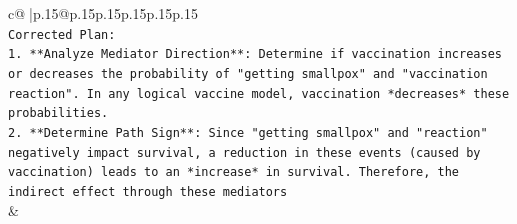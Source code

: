\documentclass{article}
\begin{document}
{\begin{supertabular}{c@{$\;$}|p{.15\linewidth}@{}p{.15\linewidth}p{.15\linewidth}p{.15\linewidth}p{.15\linewidth}p{.15\linewidth}}
{{{\\ 
\texttt{Corrected Plan:} \\
\texttt{1.  **Analyze Mediator Direction**: Determine if vaccination increases or decreases the probability of "getting smallpox" and "vaccination reaction". In any logical vaccine model, vaccination *decreases* these probabilities.} \\
\texttt{2.  **Determine Path Sign**: Since "getting smallpox" and "reaction" negatively impact survival, a reduction in these events (caused by vaccination) leads to an *increase* in survival. Therefore, the indirect effect through these mediators} \\
            }
        }
    }
    & \\ \\

\end{supertabular}
}
\end{document}
